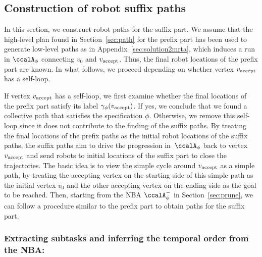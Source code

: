 \documentclass[Afour,sageh,times]{sagej}
\newcommand{\autop}{\ccalA_{\phi}}
\newcommand{\vertex}[1]{v_{\textup{#1}}}
\begin{document}
{{\subsection{Construction of robot suffix paths}\label{sec:suf}
In this section, we construct robot paths for the suffix part. We assume that the high-level plan found in Section~\ref{sec:path} for the prefix part has been used to generate low-level paths as in Appendix~\ref{sec:solution2mrta}, which induces a run in $\autop$ connecting $v_0$ and $\vertex{accept}$. Thus, the final robot locations of the prefix part are known. In what follows, we proceed depending on whether vertex $\vertex{accept}$ has a self-loop.

If  vertex $\vertex{accept}$ has a self-loop, we first examine whether the final locations of the prefix part satisfy its label $\gamma_\phi(\vertex{accept})$. If yes, we conclude that we found a collective path that satisfies the specification $\phi$. Otherwise, we remove this self-loop since it does not contribute to the finding of the suffix paths. By treating the final locations of the prefix paths as the initial robot locations of the suffix paths, the suffix paths aim to drive the progression in~$\autop$ back to vertex $\vertex{accept}$ and send robots to initial locations of the suffix part to close the trajectories.
The basic idea is to  view the simple cycle around $\vertex{accept}$ as a simple path, by treating the accepting vertex on the starting side of this simple path as the initial vertex $v_0$ and the other accepting vertex on the ending side as the goal to be reached. Then, starting from the NBA $\autop^-$ in Section~\ref{sec:prune}, we can follow a procedure similar to the prefix part to obtain paths for the suffix part.



  \subsubsection{Extracting subtasks and inferring the temporal order from the NBA:}\label{sec:suf_prune}
}}
\end{document}
